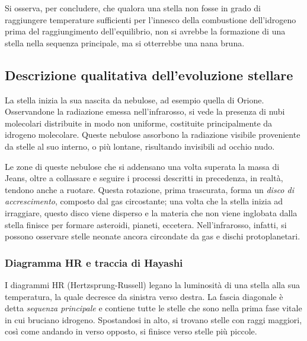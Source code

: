 \documentclass[11pt, a4paper]{scrartcl}
\theoremstyle{style}
\theoremstyle{style1}
\numberwithin{equation}{subsection}
\begin{document}
Si osserva, per concludere, che qualora una stella non fosse in grado di raggiungere temperature sufficienti per l'innesco della combustione dell'idrogeno prima del raggiungimento dell'equilibrio, non si avrebbe la formazione di una stella nella sequenza principale, ma si otterrebbe una nana bruna.
\subsection{Descrizione qualitativa dell'evoluzione stellare}
La stella inizia la sua nascita da nebulose, ad esempio quella di Orione.
Osservandone la radiazione emessa nell'infrarosso, si vede la presenza di nubi molecolari distribuite in modo non uniforme, costituite principalmente da idrogeno molecolare.
Queste nebulose assorbono la radiazione visibile proveniente da stelle al suo interno, o pi\`u lontane, risultando invisibili ad occhio nudo.

Le zone di queste nebulose che si addensano una volta superata la massa di Jeans, oltre a collassare e seguire i processi descritti in precedenza, in realt\`a, tendono anche a ruotare.
Questa rotazione, prima trascurata, forma un \textit{disco di accrescimento}, composto dal gas circostante; una volta che la stella inizia ad irraggiare, questo disco viene disperso e la materia che non viene inglobata dalla stella finisce per formare asteroidi, pianeti, eccetera.
Nell'infrarosso, infatti, si possono osservare stelle neonate ancora circondate da gas e dischi protoplanetari. 

\subsubsection{Diagramma HR e traccia di Hayashi}
	I diagrammi HR (Hertzsprung-Russell) legano la luminosit\`a di una stella alla sua temperatura, la quale decresce da sinistra verso destra.
	La fascia diagonale \`e detta \textit{sequenza principale} e contiene tutte le stelle che sono nella prima fase vitale in cui bruciano idrogeno.
	Spostandosi in alto, si trovano stelle con raggi maggiori, cos\`i come andando in verso opposto, si finisce verso stelle pi\`u piccole.
\end{document}
